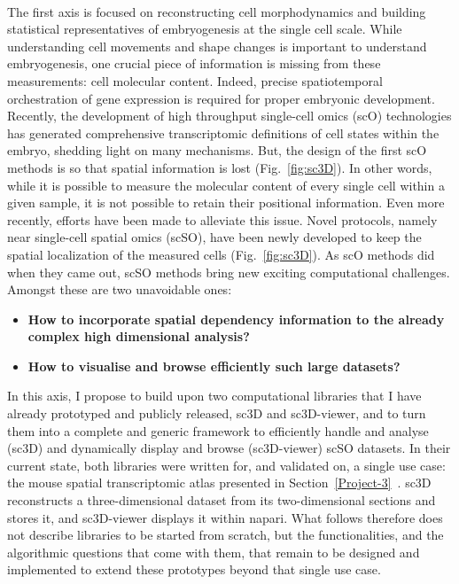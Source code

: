 \paragraph{}The first axis is focused on reconstructing cell morphodynamics and building statistical representatives of embryogenesis at the single cell scale.
While understanding cell movements and shape changes is important to understand embryogenesis, one crucial piece of information is missing from these measurements: cell molecular content.
Indeed, precise spatiotemporal orchestration of gene expression is required for proper embryonic development.
Recently, the development of high throughput single-cell omics (scO) technologies has generated comprehensive transcriptomic definitions of cell states within the embryo, shedding light on many mechanisms.
But, the design of the first scO methods is so that spatial information is lost (Fig.~\ref{fig:sc3D}).
In other words, while it is possible to measure the molecular content of every single cell within a given sample, it is not possible to retain their positional information.
Even more recently, efforts have been made to alleviate this issue.
Novel protocols, namely near single-cell spatial omics (scSO), have been newly developed to keep the spatial localization of the measured cells (Fig.~\ref{fig:sc3D}).
As scO methods did when they came out, scSO methods bring new exciting computational challenges.
Amongst these are two unavoidable ones:
\begin{itemize}
   \item \textbf{How to incorporate spatial dependency information to the already complex high dimensional analysis?}
   \item \textbf{How to visualise and browse efficiently such large datasets?}
\end{itemize}
In this axis, I propose to build upon two computational libraries that I have already prototyped and publicly released, sc3D and sc3D-viewer, and to turn them into a complete and generic framework to efficiently handle and analyse (sc3D) and dynamically display and browse (sc3D-viewer) scSO datasets.
In their current state, both libraries were written for, and validated on, a single use case: the mouse spatial transcriptomic atlas presented in Section~\ref{Project-3}~\cite{Sampath-Kuma:2022aa}.
sc3D reconstructs a three-dimensional dataset from its two-dimensional sections and stores it, and sc3D-viewer displays it within napari.
What follows therefore does not describe libraries to be started from scratch, but the functionalities, and the algorithmic questions that come with them, that remain to be designed and implemented to extend these prototypes beyond that single use case.
